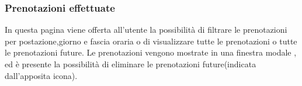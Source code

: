 \documentclass{article}
\begin{document}
\subsubsection{Prenotazioni effettuate} 
In questa pagina viene offerta all'utente la possibilità di filtrare le prenotazioni per postazione,giorno e fascia oraria o di visualizzare tutte le prenotazioni o tutte le prenotazioni future.
Le prenotazioni vengono mostrate in una finestra modale , ed è presente la possibilità di eliminare le prenotazioni future(indicata dall'apposita icona).
\end{document}
